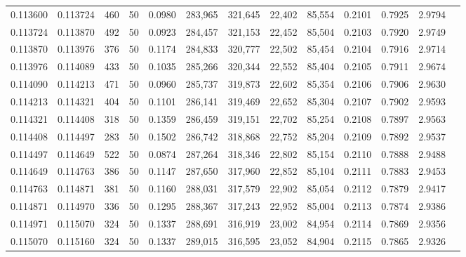 \begin{tabular}{rrrrrrrrrrrrr}
0.113600 & 0.113724 &   460 &  50 &                                     0.0980 & 283,965 & 321,645 &  22,402 &  85,554 & 0.2101 & 0.7925 & 2.9794 \\
0.113724 & 0.113870 &   492 &  50 &                                     0.0923 & 284,457 & 321,153 &  22,452 &  85,504 & 0.2103 & 0.7920 & 2.9749 \\
0.113870 & 0.113976 &   376 &  50 &                                     0.1174 & 284,833 & 320,777 &  22,502 &  85,454 & 0.2104 & 0.7916 & 2.9714 \\
0.113976 & 0.114089 &   433 &  50 &                                     0.1035 & 285,266 & 320,344 &  22,552 &  85,404 & 0.2105 & 0.7911 & 2.9674 \\
0.114090 & 0.114213 &   471 &  50 &                                     0.0960 & 285,737 & 319,873 &  22,602 &  85,354 & 0.2106 & 0.7906 & 2.9630 \\
0.114213 & 0.114321 &   404 &  50 &                                     0.1101 & 286,141 & 319,469 &  22,652 &  85,304 & 0.2107 & 0.7902 & 2.9593 \\
0.114321 & 0.114408 &   318 &  50 &                                     0.1359 & 286,459 & 319,151 &  22,702 &  85,254 & 0.2108 & 0.7897 & 2.9563 \\
0.114408 & 0.114497 &   283 &  50 &                                     0.1502 & 286,742 & 318,868 &  22,752 &  85,204 & 0.2109 & 0.7892 & 2.9537 \\
0.114497 & 0.114649 &   522 &  50 &                                     0.0874 & 287,264 & 318,346 &  22,802 &  85,154 & 0.2110 & 0.7888 & 2.9488 \\
0.114649 & 0.114763 &   386 &  50 &                                     0.1147 & 287,650 & 317,960 &  22,852 &  85,104 & 0.2111 & 0.7883 & 2.9453 \\
0.114763 & 0.114871 &   381 &  50 &                                     0.1160 & 288,031 & 317,579 &  22,902 &  85,054 & 0.2112 & 0.7879 & 2.9417 \\
0.114871 & 0.114970 &   336 &  50 &                                     0.1295 & 288,367 & 317,243 &  22,952 &  85,004 & 0.2113 & 0.7874 & 2.9386 \\
0.114971 & 0.115070 &   324 &  50 &                                     0.1337 & 288,691 & 316,919 &  23,002 &  84,954 & 0.2114 & 0.7869 & 2.9356 \\
0.115070 & 0.115160 &   324 &  50 &                                     0.1337 & 289,015 & 316,595 &  23,052 &  84,904 & 0.2115 & 0.7865 & 2.9326 \\

\end{tabular}
